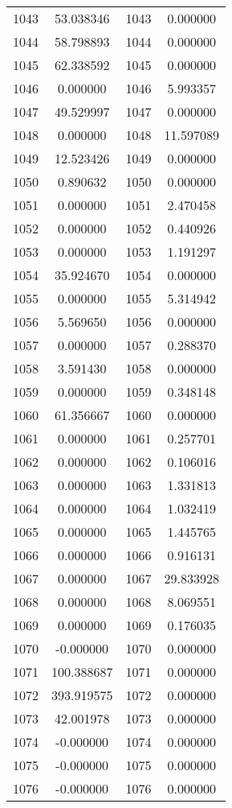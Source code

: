 \documentclass[12pt]{article}
\begin{document}
\begin{longtable}{@{}cccc@{}}
1043 & 53.038346 & 1043 & 0.000000 \\
1044 & 58.798893 & 1044 & 0.000000 \\
1045 & 62.338592 & 1045 & 0.000000 \\
1046 & 0.000000 & 1046 & 5.993357 \\
1047 & 49.529997 & 1047 & 0.000000 \\
1048 & 0.000000 & 1048 & 11.597089 \\
1049 & 12.523426 & 1049 & 0.000000 \\
1050 & 0.890632 & 1050 & 0.000000 \\
1051 & 0.000000 & 1051 & 2.470458 \\
1052 & 0.000000 & 1052 & 0.440926 \\
1053 & 0.000000 & 1053 & 1.191297 \\
1054 & 35.924670 & 1054 & 0.000000 \\
1055 & 0.000000 & 1055 & 5.314942 \\
1056 & 5.569650 & 1056 & 0.000000 \\
1057 & 0.000000 & 1057 & 0.288370 \\
1058 & 3.591430 & 1058 & 0.000000 \\
1059 & 0.000000 & 1059 & 0.348148 \\
1060 & 61.356667 & 1060 & 0.000000 \\
1061 & 0.000000 & 1061 & 0.257701 \\
1062 & 0.000000 & 1062 & 0.106016 \\
1063 & 0.000000 & 1063 & 1.331813 \\
1064 & 0.000000 & 1064 & 1.032419 \\
1065 & 0.000000 & 1065 & 1.445765 \\
1066 & 0.000000 & 1066 & 0.916131 \\
1067 & 0.000000 & 1067 & 29.833928 \\
1068 & 0.000000 & 1068 & 8.069551 \\
1069 & 0.000000 & 1069 & 0.176035 \\
1070 & -0.000000 & 1070 & 0.000000 \\
1071 & 100.388687 & 1071 & 0.000000 \\
1072 & 393.919575 & 1072 & 0.000000 \\
1073 & 42.001978 & 1073 & 0.000000 \\
1074 & -0.000000 & 1074 & 0.000000 \\
1075 & -0.000000 & 1075 & 0.000000 \\
1076 & -0.000000 & 1076 & 0.000000 \\

\end{longtable}
\end{document}
